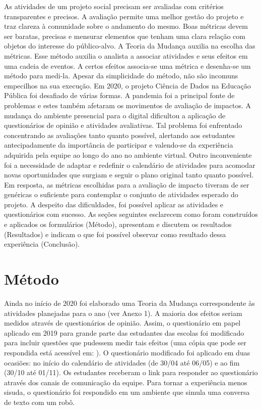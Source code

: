 \documentclass[
]{book}
\begin{document}
As atividades de um projeto social precisam ser avaliadas com critérios transparentes e precisos. A avaliação permite uma melhor gestão do projeto e traz clareza à comunidade sobre o andamento do mesmo. Boas métricas devem ser baratas, precisas e mensurar elementos que tenham uma clara relação com objetos do interesse do público-alvo. A Teoria da Mudança auxilia na escolha das métricas. Esse método auxilia o analista a associar atividades e seus efeitos em uma cadeia de eventos. A certos efeitos associa-se uma métrica e desenha-se um método para medi-la. Apesar da simplicidade do método, não são incomuns empecilhos na sua execução.
Em 2020, o projeto Ciência de Dados na Educação Pública foi desafiado de várias formas. A pandemia foi a principal fonte de problemas e estes também afetaram os movimentos de avaliação de impactos. A mudança do ambiente presencial para o digital dificultou a aplicação de questionários de opinião e atividades avaliativas. Tal problema foi enfrentado concentrando as avaliações tanto quanto possível, alertando aos estudantes antecipadamente da importância de participar e valendo-se da experiência adquirida pela equipe ao longo do ano no ambiente virtual. Outro inconveniente foi a necessidade de adaptar e redefinir o calendário de atividades para acomodar novas oportunidades que surgiam e seguir o plano original tanto quanto possível. Em resposta, as métricas escolhidas para a avaliação de impacto tiveram de ser genéricas o suficiente para contemplar o conjunto de atividades esperado do projeto.
A despeito das dificuldades, foi possível aplicar as atividades e questionários com sucesso. As seções seguintes esclarecem como foram construídos e aplicados os formulários (Método), apresentam e discutem os resultados (Resultados) e indicam o que foi possível observar como resultado dessa experiência (Conclusão).

\hypertarget{muxe9todo}{%
\section{Método}\label{muxe9todo}}

Ainda no início de 2020 foi elaborado uma Teoria da Mudança correspondente às atividades planejadas para o ano (ver Anexo 1). A maioria dos efeitos seriam medidos através de questionários de opinião. Assim, o questionário em papel aplicado em 2019 para grande parte das estudantes das escolas foi modificado para incluir questões que pudessem medir tais efeitos (uma cópia que pode ser respondida está acessível em: \href{https://forms.gle/QP9crYYY6x1XhF7RA}{}). O questionário modificado foi aplicado em duas ocasiões: no início do calendário de atividades (de 30/04 até 06/05) e ao fim (30/10 até 01/11). Os estudantes receberam o link para responder ao questionário através dos canais de comunicação da equipe. Para tornar a experiência menos sisuda, o questionário foi respondido em um ambiente que simula uma conversa de texto com um robô.
\end{document}
